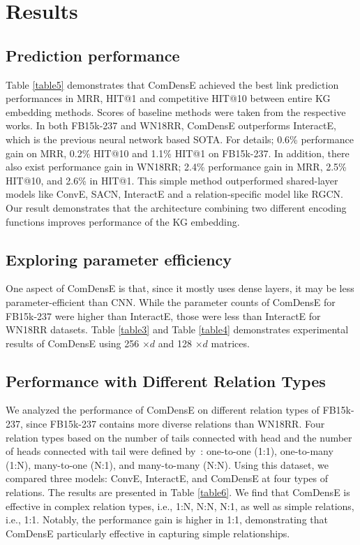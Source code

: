 \section{Results}

\subsection{Prediction performance}
Table \ref{table5} demonstrates that ComDensE achieved the best link prediction performances in MRR, HIT@1 and competitive HIT@10 between entire KG embedding methods. Scores of baseline methods were taken from the respective works. In both FB15k-237 and WN18RR, ComDensE outperforms InteractE, which is the previous neural network based SOTA. For details; 0.6\% performance gain on MRR, 0.2\% HIT@10 and 1.1\% HIT@1 on FB15k-237. In addition, there also exist performance gain in WN18RR; 2.4\% performance gain in MRR, 2.5\% HIT@10, and 2.6\% in HIT@1. This simple method outperformed shared-layer models like ConvE, SACN, InteractE and a relation-specific model like RGCN. Our result demonstrates that the architecture combining two different encoding functions improves performance of the KG embedding.

\subsection{Exploring parameter efficiency}
One aspect of ComDensE is that, since it mostly uses dense layers, it may be less parameter-efficient than CNN. While the parameter counts of ComDensE for FB15k-237 were higher than InteractE, those were less than InteractE for WN18RR datasets. Table \ref{table3} and Table \ref{table4} demonstrates experimental results of ComDensE using 256 $\times d$ and 128 $\times d$  matrices.

\subsection{Performance with Different Relation Types}
We analyzed the performance of ComDensE on different relation types of FB15k-237, since FB15k-237 contains more diverse relations than WN18RR. Four relation types based on the number of tails connected with head and the number of heads connected with tail were defined by~\cite{wang2014knowledge}: one-to-one (1:1), one-to-many (1:N), many-to-one (N:1), and many-to-many (N:N). Using this dataset, we compared three models: ConvE, InteractE, and ComDensE at four types of relations. The results are presented in Table \ref{table6}. We find that ComDensE is effective in complex relation types, i.e.,  1:N, N:N, N:1, as well as simple relations, i.e., 1:1. Notably, the performance gain is higher in 1:1, demonstrating that ComDensE particularly effective in capturing simple relationships.

